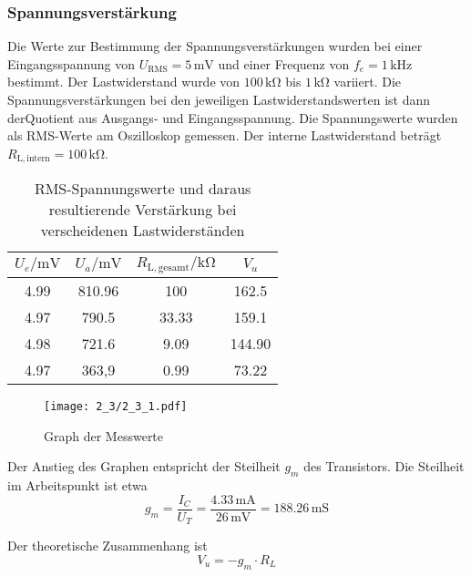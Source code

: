 \subsubsection{Spannungsverstärkung}
Die Werte zur Bestimmung der Spannungsverstärkungen wurden bei einer
Eingangsspannung von $U_{\mathrm{RMS}} = 5 \, \si{\milli\volt}$ und einer
Frequenz von $f_e = 1 \, \si{\kilo\hertz}$ bestimmt. Der Lastwiderstand wurde
von $100 \, \si{\kilo\ohm}$ bis $1 \, \si{\kilo\ohm}$ variiert. Die
Spannungsverstärkungen bei den jeweiligen Lastwiderstandswerten ist dann
derQuotient aus Ausgangs- und Eingangsspannung. Die Spannungswerte wurden
als RMS-Werte am Oszilloskop gemessen. Der interne Lastwiderstand beträgt $R_{\mathrm{L,intern}} =
100 \, \si{\kilo\ohm}$.

\begin{table}[H]
  \begin{center}
    \begin{tabular}{|c|c|c|c|}
      $U_e / \si{\milli\volt}$ & $U_a / \si{\milli\volt}$ & $R_{\mathrm{L,gesamt}} / \si{\kilo\ohm}$ & $V_u$\\
      \hline
      \hline

      4.99 & 810.96 & 100 & 162.5\\
      4.97 & 790.5 & 33.33 & 159.1\\
      4.98 & 721.6 & 9.09 & 144.90\\
      4.97 & 363,9 & 0.99 & 73.22\\
      \hline
    \end{tabular}

  \end{center}

  \caption{RMS-Spannungswerte und daraus resultierende Verstärkung bei
    verscheidenen Lastwiderständen}

\end{table}

\begin{figure}[H]
  \begin{center}
    \texttt{[image: 2\_3/2\_3\_1.pdf]}
  \end{center}
  \caption{Graph der Messwerte}
\end{figure}

Der Anstieg des Graphen entspricht der Steilheit $g_m$ des Transistors. Die
Steilheit im Arbeitspunkt ist etwa
\[g_m = \frac{I_C}{U_T} = \frac{4.33 \, \si{\milli\ampere}}{26 \,
    \si{\milli\volt}} = 188.26 \, \si{\milli\siemens}\]

Der theoretische Zusammenhang ist
\[V_u = - g_m \cdot R_L \] 

